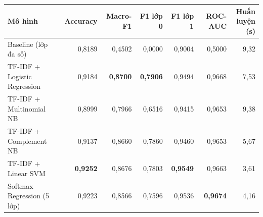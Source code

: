 \begin{tabular}{lrrrrrr}
\toprule
Mô hình & Accuracy & Macro-F1 & F1 lớp 0 & F1 lớp 1 & ROC-AUC & \makecell[r]{Huấn\\luyện (s)} \\
\midrule
Baseline (lớp đa số) & 0{,}8189 & 0{,}4502 & 0{,}0000 & 0{,}9004 & 0{,}5000 & 9{,}32 \\
TF-IDF + Logistic Regression & 0{,}9184 & \textbf{0{,}8700} & \textbf{0{,}7906} & 0{,}9494 & 0{,}9668 & 7{,}53 \\
TF-IDF + Multinomial NB & 0{,}8999 & 0{,}7966 & 0{,}6516 & 0{,}9415 & 0{,}9653 & 9{,}38 \\
TF-IDF + Complement NB & 0{,}9137 & 0{,}8660 & 0{,}7860 & 0{,}9460 & 0{,}9653 & 5{,}67 \\
TF-IDF + Linear SVM & \textbf{0{,}9252} & 0{,}8676 & 0{,}7803 & \textbf{0{,}9549} & 0{,}9663 & 3{,}61 \\
Softmax Regression (5 lớp) & 0{,}9223 & 0{,}8566 & 0{,}7596 & 0{,}9536 & \textbf{0{,}9674} & 4{,}16 \\
\bottomrule
\end{tabular}
